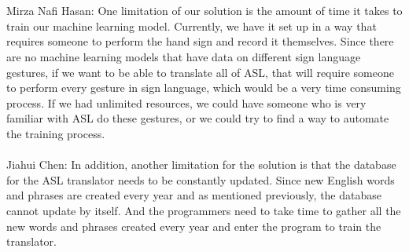 \documentclass[12pt, titlepage]{article}
\begin{document}
\begin{enumerate}
   ~\\
  \\
    Mirza Nafi Hasan: One limitation of our solution is the amount of time it takes to train our machine learning model. Currently, we have it set up in a way 
that requires someone to perform the hand sign and record it themselves. Since there are no machine learning models that have data on different sign language
gestures, if we want to be able to translate all of ASL, that will require someone to perform every gesture in sign language, which would be a very time 
consuming process. If we had unlimited resources, we could have someone who is very familiar with ASL do these gestures, or we could try to find a way to
automate the training process.
  \\
  ~\\


  Jiahui Chen: In addition, another limitation for the solution is that the database for the ASL translator needs to be constantly updated. Since new English words and phrases are created every year and as mentioned previously, the database cannot update by itself. And the programmers need to take time to gather all the new words and phrases created every year and enter the program to train the translator. 
  \\
  ~\\
 \\
  

\end{enumerate}
\end{document}
